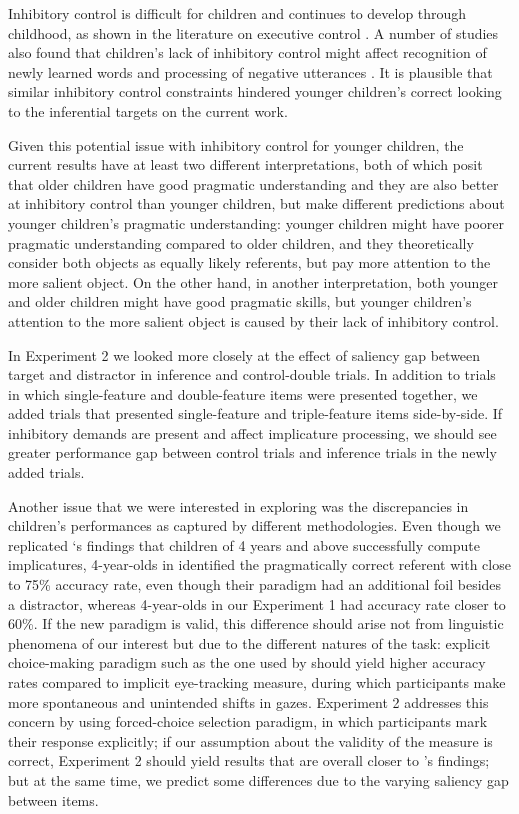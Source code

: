 \documentclass[10pt,letterpaper]{article}
\begin{document}
Inhibitory control is difficult for children and continues to develop through childhood, as shown in the literature on executive control \cite{davidson2006development, gerardi2000sensitivity}. A number of studies also found that children's lack of inhibitory control might affect recognition of newly learned words \cite{yurovskybeyond} and processing of negative utterances \cite{nordmeyer2013measuring}. It is plausible that similar inhibitory control constraints hindered younger children's correct looking to the inferential targets on the current work. 

Given this potential issue with inhibitory control for younger children, the current results have at least two different interpretations, both of which posit that older children have good pragmatic understanding and they are also better at inhibitory control than younger children, but make different predictions about younger children's pragmatic understanding: younger children might have poorer pragmatic understanding compared to older children, and they theoretically consider both objects as equally likely referents, but pay more attention to the more salient object. On the other hand, in another interpretation, both younger and older children might have good pragmatic skills, but younger children's attention to the more salient object is caused by their lack of inhibitory control.

In Experiment 2 we looked more closely at the effect of saliency gap between target and distractor in inference and control-double trials. In addition to trials in which single-feature and double-feature items were presented together, we added trials that presented single-feature and triple-feature items side-by-side. If inhibitory demands are present and affect implicature processing, we should see greater performance gap between control trials and inference trials in the newly added trials. 

Another issue that we were interested in exploring was the discrepancies in children's performances as captured by different methodologies. Even though we replicated `s findings that children of 4 years and above successfully compute implicatures, 4-year-olds in  identified the pragmatically correct referent with close to 75\% accuracy rate, even though their paradigm had an additional foil besides a distractor, whereas 4-year-olds in our Experiment 1 had accuracy rate closer to 60\%. If the new paradigm is valid, this difference should arise not from linguistic phenomena of our interest but due to the different natures of the task: explicit choice-making paradigm such as the one used by  should yield higher accuracy rates compared to implicit eye-tracking measure, during which participants make more spontaneous and unintended shifts in gazes. Experiment 2 addresses this concern by using forced-choice selection paradigm, in which participants mark their response explicitly; if our assumption about the validity of the measure is correct, Experiment 2 should yield results that are overall closer to 's findings; but at the same time, we predict some differences due to the varying saliency gap between items. 
\end{document}

